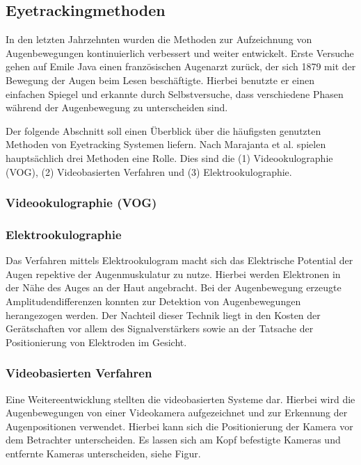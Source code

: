 \subsection{Eyetrackingmethoden}

In den letzten Jahrzehnten wurden die Methoden zur Aufzeichnung von Augenbewegungen kontinuierlich verbessert und weiter entwickelt. Erste Versuche gehen auf Emile Java einen französischen Augenarzt zurück, der sich 1879 mit der Bewegung der Augen beim Lesen beschäftigte. Hierbei benutzte er einen einfachen Spiegel und erkannte durch Selbstversuche, dass verschiedene Phasen während der Augenbewegung zu unterscheiden sind. 

Der folgende Abschnitt soll einen Überblick über die häufigsten genutzten Methoden von Eyetracking Systemen liefern. Nach Marajanta et al. \cite{Majaranta2014} spielen hauptsächlich drei Methoden eine Rolle. Dies sind die (1) Videookulographie (VOG), (2) Videobasierten Verfahren und (3) Elektrookulographie. 


\subsubsection{Videookulographie (VOG)}


\subsubsection{Elektrookulographie}
Das Verfahren mittels Elektrookulogram macht sich das Elektrische Potential der Augen repektive der Augenmuskulatur zu nutze. Hierbei werden Elektronen in der Nähe des Auges an der Haut angebracht. Bei der Augenbewegung erzeugte Amplitudendifferenzen konnten zur Detektion von Augenbewegungen herangezogen werden. Der Nachteil dieser Technik liegt in den Kosten der Gerätschaften vor allem des Signalverstärkers sowie an der Tatsache der Positionierung von Elektroden im Gesicht.

\subsubsection{Videobasierten Verfahren}
Eine Weitereentwicklung stellten die videobasierten Systeme dar. Hierbei wird die Augenbewegungen von einer Videokamera aufgezeichnet und zur Erkennung der Augenpositionen verwendet. Hierbei kann sich die Positionierung der Kamera vor dem Betrachter unterscheiden. Es lassen sich am Kopf befestigte Kameras und entfernte Kameras unterscheiden, siehe Figur. 

